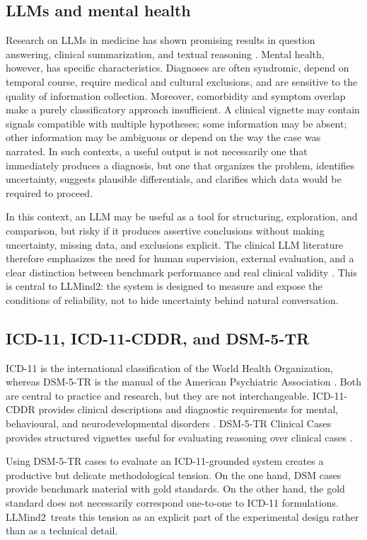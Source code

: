 \documentclass[11pt,a4paper]{article}
\newcommand{\llmind}{LLMind2}
\begin{document}
\subsection{LLMs and mental health}
Research on LLMs in medicine has shown promising results in question answering, clinical summarization, and textual reasoning \citep{singhal2023medpalm,peng2023medical}. Mental health, however, has specific characteristics. Diagnoses are often syndromic, depend on temporal course, require medical and cultural exclusions, and are sensitive to the quality of information collection. Moreover, comorbidity and symptom overlap make a purely classificatory approach insufficient. A clinical vignette may contain signals compatible with multiple hypotheses; some information may be absent; other information may be ambiguous or depend on the way the case was narrated. In such contexts, a useful output is not necessarily one that immediately produces a diagnosis, but one that organizes the problem, identifies uncertainty, suggests plausible differentials, and clarifies which data would be required to proceed.

In this context, an LLM may be useful as a tool for structuring, exploration, and comparison, but risky if it produces assertive conclusions without making uncertainty, missing data, and exclusions explicit. The clinical LLM literature therefore emphasizes the need for human supervision, external evaluation, and a clear distinction between benchmark performance and real clinical validity \citep{singhal2023medpalm}. This is central to \llmind: the system is designed to measure and expose the conditions of reliability, not to hide uncertainty behind natural conversation.

\subsection{ICD-11, ICD-11-CDDR, and DSM-5-TR}
ICD-11 is the international classification of the World Health Organization, whereas DSM-5-TR is the manual of the American Psychiatric Association \citep{who2022icd11,apa2022dsm5tr}. Both are central to practice and research, but they are not interchangeable. ICD-11-CDDR provides clinical descriptions and diagnostic requirements for mental, behavioural, and neurodevelopmental disorders \citep{who2024cddr}. DSM-5-TR Clinical Cases provides structured vignettes useful for evaluating reasoning over clinical cases \citep{apa2023clinicalcases}.

Using DSM-5-TR cases to evaluate an ICD-11-grounded system creates a productive but delicate methodological tension. On the one hand, DSM cases provide benchmark material with gold standards. On the other hand, the gold standard does not necessarily correspond one-to-one to ICD-11 formulations. \llmind\ treats this tension as an explicit part of the experimental design rather than as a technical detail.
\end{document}
